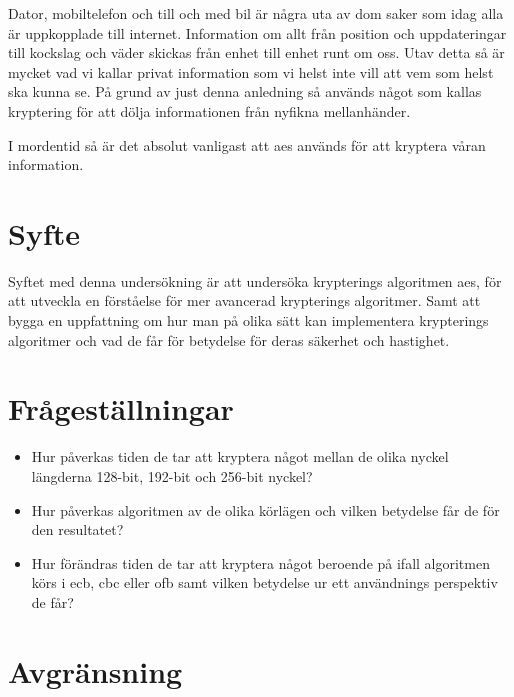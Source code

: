 
Dator, mobiltelefon och till och med bil är några uta av dom saker som idag alla är uppkopplade
till internet. Information om allt från position och uppdateringar till kockslag och väder skickas
från enhet till enhet runt om oss. Utav detta så är mycket vad vi kallar privat information som
vi helst inte vill att vem som helst ska kunna se. På grund av just denna anledning så används
något som kallas kryptering för att dölja informationen från nyfikna mellanhänder.

I mordentid så är det absolut vanligast att \acrfull{aes} används för att kryptera våran information.


\section{Syfte} %
Syftet med denna undersökning är att undersöka krypterings algoritmen \acrshort{aes},
för att utveckla en förståelse för mer avancerad krypterings algoritmer.
Samt att bygga en uppfattning om hur man på olika sätt kan implementera
krypterings algoritmer och vad de får för betydelse för deras säkerhet och
hastighet.

\section{Frågeställningar} %
\begin{itemize}
    \setlength{\itemindent}{-1em}
    \item Hur påverkas tiden de tar att kryptera något mellan de olika nyckel längderna 128-bit,
          192-bit och 256-bit nyckel?

    \item Hur påverkas algoritmen av de olika körlägen och vilken betydelse får de för den resultatet?

    \item Hur förändras tiden de tar att kryptera något beroende på ifall algoritmen körs i
          \acrshort{ecb}, \acrshort{cbc} eller \acrshort{ofb} samt vilken betydelse ur ett
          användnings perspektiv de får?
\end{itemize}

\section{Avgränsning} %

